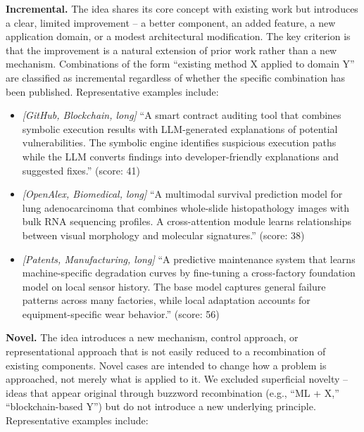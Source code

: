 \textbf{Incremental.} The idea shares its core concept with existing work but introduces a clear, limited improvement -- a better component, an added feature, a new application domain, or a modest architectural modification. The key criterion is that the improvement is a natural extension of prior work rather than a new mechanism. Combinations of the form ``existing method X applied to domain Y'' are classified as incremental regardless of whether the specific combination has been published. Representative examples include:
 
\begin{itemize}
    \item \textit{[GitHub, Blockchain, long]} ``A smart contract auditing tool that combines symbolic execution results with LLM-generated explanations of potential vulnerabilities. The symbolic engine identifies suspicious execution paths while the LLM converts findings into developer-friendly explanations and suggested fixes.'' (score: 41)
    \item \textit{[OpenAlex, Biomedical, long]} ``A multimodal survival prediction model for lung adenocarcinoma that combines whole-slide histopathology images with bulk RNA sequencing profiles. A cross-attention module learns relationships between visual morphology and molecular signatures.'' (score: 38)
    \item \textit{[Patents, Manufacturing, long]} ``A predictive maintenance system that learns machine-specific degradation curves by fine-tuning a cross-factory foundation model on local sensor history. The base model captures general failure patterns across many factories, while local adaptation accounts for equipment-specific wear behavior.'' (score: 56)
\end{itemize}
 
\textbf{Novel.} The idea introduces a new mechanism, control approach, or representational approach that is not easily reduced to a recombination of existing components. Novel cases are intended to change how a problem is approached, not merely what is applied to it. We excluded superficial novelty -- ideas that appear original through buzzword recombination (e.g., ``ML + X,'' ``blockchain-based Y'') but do not introduce a new underlying principle. Representative examples include:
 
